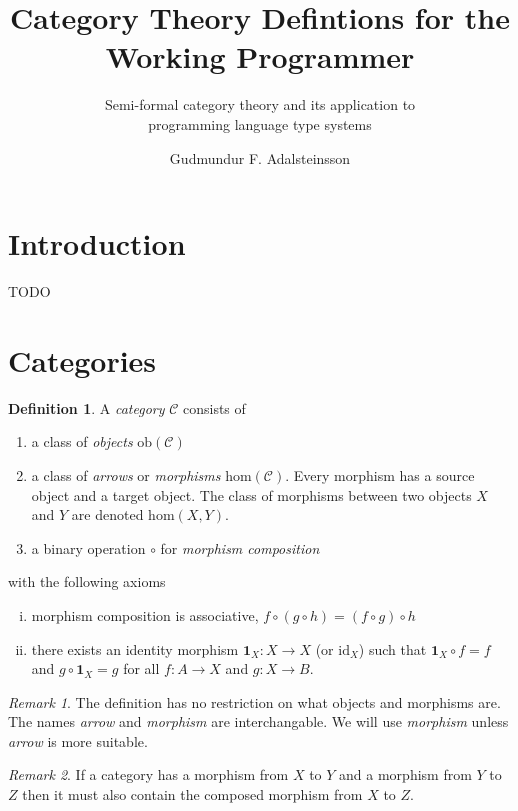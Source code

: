 \documentclass[11pt,a4paper]{scrartcl}
\title{Category Theory Defintions for the \\Working Programmer }
\subtitle{Semi-formal category theory and its application to \\programming language type systems}
\author{Gudmundur F. Adalsteinsson}
\newcommand{\cdef}[1]{\emph{#1}}
\newcommand{\idm}[1]{\mathbf{1}_{#1}}
\theoremstyle{plain}
\theoremstyle{definition}
\newtheorem{defn}{Definition}
\theoremstyle{remark}
\newtheorem*{remark}{Remark}
\begin{document}
\maketitle
{}
\tableofcontents
\clearpage

\section{Introduction}
TODO

\section{Categories}


\begin{defn}
A \cdef{category} $\mathcal{C}$ consists of
\begin{enumerate}
	\item a class of \cdef{objects} $\text{ob}(\mathcal{C})$
	\item a class of \cdef{arrows} or \cdef{morphisms} $\text{hom}(\mathcal{C})$. Every morphism has a source object and a target object. The class of morphisms between two objects $X$ and $Y$ are denoted $\text{hom}(X,Y)$.
	\item a binary operation $\circ$ for \cdef{morphism composition}
\end{enumerate}
with the following axioms
\begin{enumerate}[(i)]
	\item morphism composition is associative, $f \circ (g \circ h) = (f \circ g) \circ h$
	\item there exists an identity morphism $\idm{X}\colon X \to X$ (or $\text{id}_X$) such that $\idm{X} \circ f = f$ and $g \circ \idm{X} = g$ for all $f\colon A \to X$ and $g\colon X \to B$.
\end{enumerate}
\end{defn}

\begin{remark}
	The definition has no restriction on what objects and morphisms are. The names \emph{arrow} and \emph{morphism} are interchangable. We will use \emph{morphism} unless \emph{arrow} is more suitable.
\end{remark}
\begin{remark}
	If a category has a morphism from $X$ to $Y$ and a morphism from $Y$ to $Z$ then it must also contain the composed morphism from $X$ to $Z$.
\end{remark}
\end{document}
